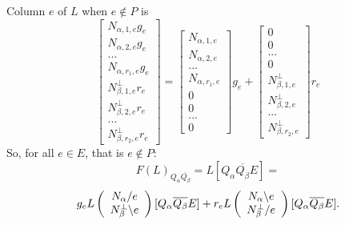 \documentclass{beamer}
\begin{document}
\begin{frame}
  Column $e$ of $L$ when $e\not\in P$ is
\[
\left[\begin{array}{c}
    N_{\alpha,1,e}g_e\\
    N_{\alpha,2,e}g_e\\
    ...\\
    N_{\alpha,r_1,e}g_e\\
    N_{\beta,1,e}^\perp r_e\\
    N_{\beta,2,e}^\perp r_e\\
    ...\\
    N_{\beta,r_2,e}^\perp r_e
  \end{array}\right]
=
\left[\begin{array}{c}
    N_{\alpha,1,e}\\
    N_{\alpha,2,e}\\
    ...\\
    N_{\alpha,r_1,e}\\
    0\\
    0\\
    ...\\
    0
  \end{array}\right]g_e
+
\left[\begin{array}{c}
    0\\
    0\\
    ...\\
    0\\
    N_{\beta,1,e}^\perp \\
    N_{\beta,2,e}^\perp\\
    ...\\
    N_{\beta,r_2,e}^\perp
  \end{array}\right]r_e
\]
So, for all $e\in E$\alert{, that is $e\not\in P$}:
\[
F(L)_{Q_\alpha \overline{Q_\beta} } = L[Q_\alpha \overline{Q_\beta} E ] =
\]
\[
g_eL\left(\begin{array}{c} N_{\alpha}/e\\ N_{\beta}^{\perp}\backslash e \end{array} \right)[Q_\alpha \overline{Q_\beta} E]
+
r_eL\left(\begin{array}{c} N_{\alpha}\backslash e\\ N_{\beta}^{\perp}/e \end{array} \right)[Q_\alpha \overline{Q_\beta} E].
\]
\end{frame}
\end{document}
